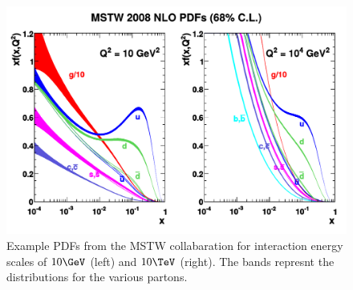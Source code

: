 \begin{figure}[!htb]
    \centering
    \includegraphics[width=\textwidth]{figures/mstw_pdfs.pdf}
    \caption[
        Example PDFs from the MSTW collabaration.
    ]{
        Example PDFs from the MSTW collabaration for interaction energy scales
        of $10 \GeV$ (left) and $10 \TeV$ (right). The bands represnt the
        \BjorkenX distributions for the various partons.
    }
    \label{fig:mstw_pdf}
\end{figure}

